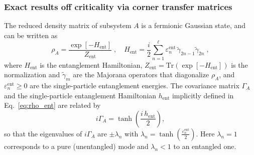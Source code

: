 \documentclass[prx,twocolumn,superscriptaddress,aps,10pt, frontmatterverbose, reprint,footinbib,longbibliography=true]{revtex4-2}
\begin{document}
\subsubsection{Exact results off criticality via corner transfer matrices}
The reduced density matrix of subsystem $A$ is a fermionic Gaussian state, and can be written as~\cite{Peschel2004}
\begin{equation}
    \rho_A = \frac{\exp[{-H_{\mathrm{ent}}}]}{Z_{\mathrm{ent}}}\;, \quad H_{\mathrm{ent}} = \frac{i}{2}\sum_{n=1}^{\ell} \varepsilon_n^{\mathrm{ent}}\,\tilde\gamma_{2n-1}\tilde\gamma_{2n}\;,
    \label{eq:rho_ent}
\end{equation}
where $H_{\mathrm{ent}}$ is the entanglement Hamiltonian, $Z_{\mathrm{ent}}=\mathrm{Tr}(\exp[{-H_{\mathrm{ent}}}])$ is the normalization and $\tilde\gamma_m$ are the Majorana operators that diagonalize $\rho_A$, and $\varepsilon_n^{\mathrm{ent}} \geq 0$ are the single-particle entanglement energies.
The covariance matrix $\Gamma_A$ and the single-particle entanglement Hamiltonian $h_{\mathrm{ent}}$ implicitly defined in Eq.~\eqref{eq:rho_ent} are related by
\begin{equation}
    i\Gamma_A = \tanh\!\left(\frac{i\,h_{\mathrm{ent}}}{2}\right),
    \label{eq:Gamma_tanh}
\end{equation}
so that the eigenvalues of $i\Gamma_A$ are $\pm\lambda_n$ with $\lambda_n = \tanh\!\left(\frac{\varepsilon_n^{\mathrm{ent}}}{2}\right)$. 
Here $\lambda_n = 1$ corresponds to a pure (unentangled) mode and $\lambda_n < 1$ to an entangled one.
\end{document}

